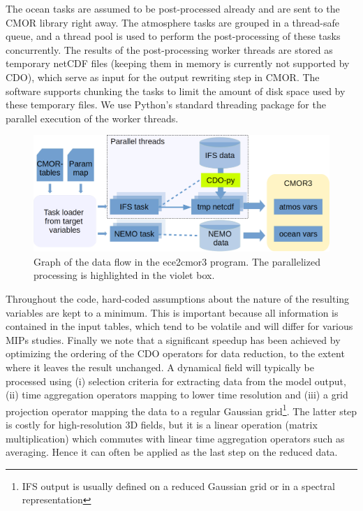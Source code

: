\documentclass[procedia]{easychair}
\begin{document}
The ocean tasks are assumed to be post-processed already and are sent to the 
CMOR library right away. The atmosphere tasks are grouped in a thread-safe 
queue, and a thread pool is used to perform the post-processing of these 
tasks concurrently. The results of the post-processing worker threads are 
stored as temporary netCDF files (keeping them in memory is currently not 
supported by CDO), which serve as input for the output rewriting step in CMOR. 
The software supports chunking the tasks to limit the amount of disk space used 
by these temporary files. We use Python's standard threading package for the 
parallel execution of the worker threads.

\begin{figure}[ht]
 \centering
 \includegraphics[width=\textwidth,clip]{ece2cmor3flowv3.png}
 \caption{Graph of the data flow in the ece2cmor3 program. The parallelized 
processing is highlighted in the violet box.}
\label{fig:design}
\end{figure}

Throughout the code, hard-coded assumptions about the nature of the resulting 
variables are kept to a minimum. This is important because all information is 
contained in the input tables, which tend to be volatile and will differ for 
various MIPs studies. Finally we note that a significant speedup has 
been achieved by optimizing the ordering of the CDO operators for data 
reduction, to the extent where it leaves the result unchanged. A dynamical 
field will typically be processed using (i) selection criteria for extracting 
data from the model output, (ii) time aggregation operators mapping to lower 
time resolution and (iii) a grid projection operator mapping the data to a 
regular Gaussian grid\footnote{IFS output is usually defined on a reduced 
Gaussian grid or in a spectral representation}. The latter step is costly for 
high-resolution 3D fields, but it is a linear operation (matrix multiplication) 
which commutes with linear time aggregation operators such as averaging. Hence 
it can often be applied as the last step on the reduced data.
\end{document}

